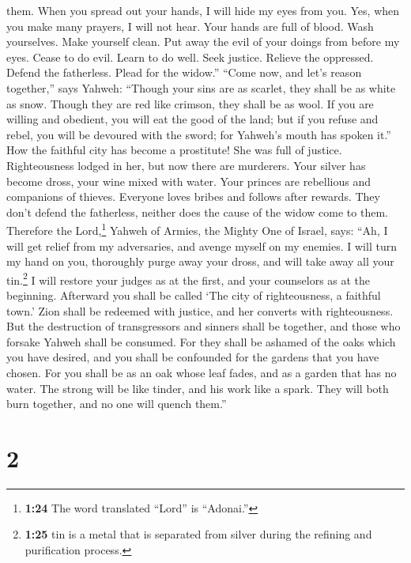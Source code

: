them.  When you spread out your hands, I will hide my
eyes from you. Yes, when you make many prayers, I will not hear. Your
hands are full of blood.  Wash yourselves. Make yourself
clean. Put away the evil of your doings from before my eyes. Cease to do
evil.  Learn to do well. Seek justice. Relieve the
oppressed. Defend the fatherless. Plead for the widow.'' 
``Come now, and let's reason together,'' says Yahweh: ``Though your sins
are as scarlet, they shall be as white as snow. Though they are red like
crimson, they shall be as wool.  If you are willing and
obedient, you will eat the good of the land;  but if you
refuse and rebel, you will be devoured with the sword; for Yahweh's
mouth has spoken it.''  How the faithful city has become
a prostitute! She was full of justice. Righteousness lodged in her, but
now there are murderers.  Your silver has become dross,
your wine mixed with water.  Your princes are rebellious
and companions of thieves. Everyone loves bribes and follows after
rewards. They don't defend the fatherless, neither does the cause of the
widow come to them.  Therefore the Lord,\footnote{\textbf{1:24}
  The word translated ``Lord'' is ``Adonai.''} Yahweh of Armies, the
Mighty One of Israel, says: ``Ah, I will get relief from my adversaries,
and avenge myself on my enemies.  I will turn my hand on
you, thoroughly purge away your dross, and will take away all your
tin.\footnote{\textbf{1:25} tin is a metal that is separated from silver
  during the refining and purification process.}  I will
restore your judges as at the first, and your counselors as at the
beginning. Afterward you shall be called `The city of righteousness, a
faithful town.'  Zion shall be redeemed with justice, and
her converts with righteousness.  But the destruction of
transgressors and sinners shall be together, and those who forsake
Yahweh shall be consumed.  For they shall be ashamed of
the oaks which you have desired, and you shall be confounded for the
gardens that you have chosen.  For you shall be as an oak
whose leaf fades, and as a garden that has no water.  The
strong will be like tinder, and his work like a spark. They will both
burn together, and no one will quench them.''

\hypertarget{section-1}{%
\section{2}\label{section-1}}

